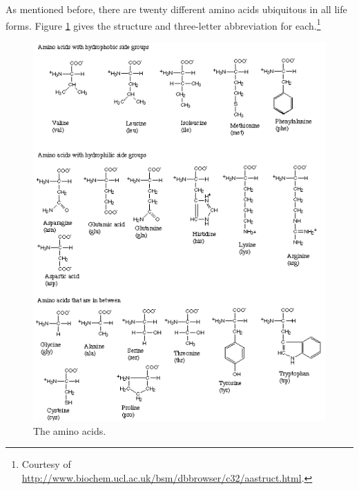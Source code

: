 As mentioned before, there are twenty different amino acids ubiquitous in all life forms.  Figure \ref{Fig8-3} gives the structure and three-letter abbreviation for each.\footnote[4]{Courtesy of \href{http://www.biochem.ucl.ac.uk/bsm/dbbrowser/c32/aastruct.html}{http://www.biochem.ucl.ac.uk/bsm/dbbrowser/c32/aastruct.html}.}
 \begin{figure}[!h]
 	\centering
 	\includegraphics[width=\textwidth]{./figures/Topic8/Fig8-3.png}
 	\caption{The amino acids.}
  	\label{Fig8-3}
 \end{figure}

